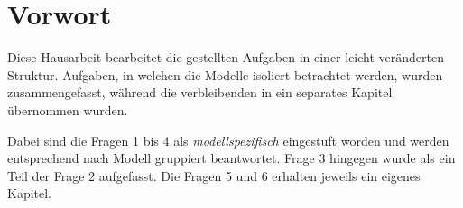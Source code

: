 \section{Vorwort}
Diese Hausarbeit bearbeitet die gestellten Aufgaben in einer leicht veränderten Struktur. Aufgaben, in welchen die Modelle isoliert betrachtet werden, wurden zusammengefasst, während die verbleibenden in ein separates Kapitel übernommen wurden.

Dabei sind die Fragen 1 bis 4 als \textit{modellspezifisch} eingestuft worden und werden entsprechend nach Modell gruppiert beantwortet. Frage 3 hingegen wurde als ein Teil der Frage 2 aufgefasst. Die Fragen 5 und 6 erhalten jeweils ein eigenes Kapitel.

